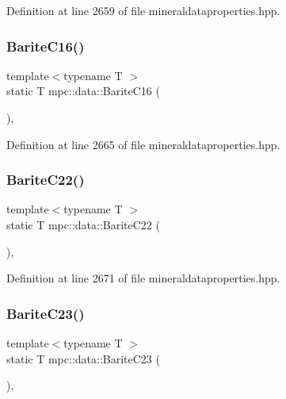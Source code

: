 Definition at line 2659 of file mineraldataproperties.\+hpp.

\mbox{\label{namespacempc_1_1data_a218a39c4d6b9a9a0fccfafbf877392f5}} 
\subsubsection{\texorpdfstring{Barite\+C16()}{BariteC16()}}
{\footnotesize\ttfamily template$<$typename T $>$ \\
static T mpc\+::data\+::\+Barite\+C16 (\begin{DoxyParamCaption}{ }\end{DoxyParamCaption})\hspace{0.3cm}{\ttfamily [inline]}, {\ttfamily [static]}}



Definition at line 2665 of file mineraldataproperties.\+hpp.

\mbox{\label{namespacempc_1_1data_a6f2392981b4e3e988b67d337cb2f2ab6}} 
\subsubsection{\texorpdfstring{Barite\+C22()}{BariteC22()}}
{\footnotesize\ttfamily template$<$typename T $>$ \\
static T mpc\+::data\+::\+Barite\+C22 (\begin{DoxyParamCaption}{ }\end{DoxyParamCaption})\hspace{0.3cm}{\ttfamily [inline]}, {\ttfamily [static]}}



Definition at line 2671 of file mineraldataproperties.\+hpp.

\mbox{\label{namespacempc_1_1data_a796e514afe3cbb3f0023235e8873ade6}} 
\subsubsection{\texorpdfstring{Barite\+C23()}{BariteC23()}}
{\footnotesize\ttfamily template$<$typename T $>$ \\
static T mpc\+::data\+::\+Barite\+C23 (\begin{DoxyParamCaption}{ }\end{DoxyParamCaption})\hspace{0.3cm}{\ttfamily [inline]}, {\ttfamily [static]}}



